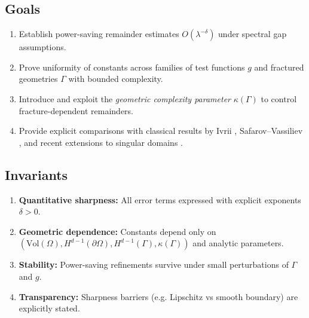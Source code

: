 \subsection*{Goals}
\begin{enumerate}[label=G\arabic*]
  \item Establish power-saving remainder estimates
  $O(\lambda^{-\delta})$ under spectral gap assumptions.
  \item Prove uniformity of constants across families of test functions $g$ and
  fractured geometries $\Gamma$ with bounded complexity.
  \item Introduce and exploit the \emph{geometric complexity parameter}
  $\kappa(\Gamma)$ to control fracture-dependent remainders.
  \item Provide explicit comparisons with classical results by Ivrii
  \cite{Ivrii1980}, Safarov--Vassiliev \cite{SafarovVassiliev1997}, and
  recent extensions to singular domains \cite{GiustiMazzola2020}.
\end{enumerate}

\subsection*{Invariants}
\begin{enumerate}[label=I\arabic*]
  \item \textbf{Quantitative sharpness:} All error terms expressed with explicit
  exponents $\delta > 0$.
  \item \textbf{Geometric dependence:} Constants depend only on
  $(\mathrm{Vol}(\Omega), H^{d-1}(\partial\Omega), H^{d-1}(\Gamma),
  \kappa(\Gamma))$ and analytic parameters.
  \item \textbf{Stability:} Power-saving refinements survive under small
  perturbations of $\Gamma$ and $g$.
  \item \textbf{Transparency:} Sharpness barriers (e.g. Lipschitz vs smooth
  boundary) are explicitly stated.
\end{enumerate}

